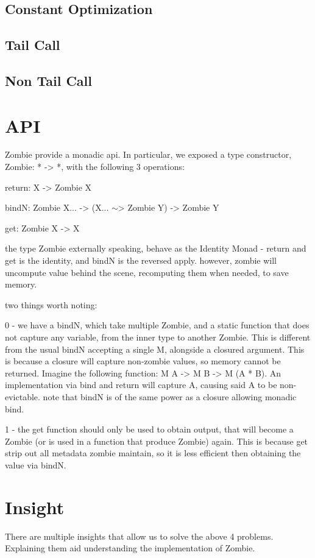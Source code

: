 \documentclass[acmsmall]{acmart}
\begin{document}
	\subsection{Constant Optimization}
	\subsection{Tail Call}
	\subsection{Non Tail Call}
	\section{API}
	Zombie provide a monadic api.
	In particular, we exposed a type constructor, Zombie: * -> *,
	with the following 3 operations:
	
	return: X -> Zombie X

	bindN: Zombie X... -> (X... $\sim$> Zombie Y) -> Zombie Y

	get: Zombie X -> X
	
	the type Zombie externally speaking, behave as the Identity Monad - return and get is the identity, and bindN is the reversed apply. however, zombie will uncompute value behind the scene, recomputing them when needed, to save memory.
	
	two things worth noting:
	
	0 - we have a bindN, which take multiple Zombie, and a static function that does not capture any variable, from the inner type to another Zombie. This is different from the usual bindN accepting a single M, alongside a closured argument. This is because a closure will capture non-zombie values, so memory cannot be returned. Imagine the following function: M A -> M B -> M (A * B). An implementation via bind and return will capture A, causing said A to be non-evictable. note that bindN is of the same power as a closure allowing monadic bind.
	
	1 - the get function should only be used to obtain output, that will become a Zombie (or is used in a function that produce Zombie) again. This is because get strip out all metadata zombie maintain, so it is less efficient then obtaining the value via bindN.

	\section{Insight}
	There are multiple insights that allow us to solve the above 4 problems. Explaining them aid understanding the implementation of Zombie.
	
\end{document}
